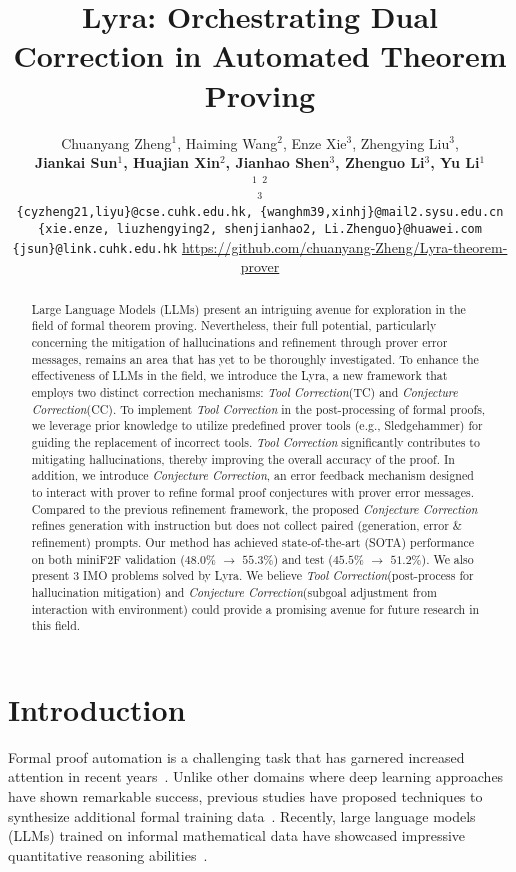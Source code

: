 \documentclass{article} \usepackage{iclr2024_conference,times}
\title{Lyra: Orchestrating Dual Correction in Automated Theorem Proving}
\author{Chuanyang Zheng$^{1}$,\space\space\space
  Haiming Wang$^{2}$,\space\space\space
  Enze Xie$^{3}$,\space\space\space
  Zhengying Liu$^{3}$,\space\space\space
\\ \vspace{0.15cm}
  \textbf{Jiankai Sun$^{1}$,\space\space\space
  Huajian Xin$^{2}$,\space\space\space
  Jianhao Shen$^{3}$,\space\space\space
  Zhenguo Li$^{3}$,\space\space\space
  Yu Li$^{1}$\space\space\space
  }
  \\
  $^{1}$\normalfont{The Chinese University of Hong Kong}\quad
  $^{2}$\normalfont{Sun Yat-sen University}\quad\\
  $^{3}$\normalfont{Huawei Noah’s Ark Lab}\quad
\vspace{0.15cm} \\
  {\tt\small \{cyzheng21,liyu\}@cse.cuhk.edu.hk,
  \{wanghm39,xinhj\}@mail2.sysu.edu.cn}\\
  {\tt\small\{xie.enze, liuzhengying2, shenjianhao2, Li.Zhenguo\}@huawei.com}\\
  {\tt\small\{jsun\}@link.cuhk.edu.hk}
  \AND
  \quad\quad\space\space\space\url{https://github.com/chuanyang-Zheng/Lyra-theorem-prover}
}
\def\methodOne{TC\xspace}
\def\methodOneFull{\textit{Tool Correction}\xspace}
\def\methodTwo{CC\xspace}
\def\methodTwoFull{\textit{Conjecture Correction}\xspace}
\def\fullname{Lyra\xspace}
\begin{document}
\maketitle

\begin{abstract}
Large Language Models (LLMs) present an intriguing avenue for exploration in the field of formal theorem proving. Nevertheless, their full potential, particularly concerning the mitigation of hallucinations and refinement through prover error messages, remains an area that has yet to be thoroughly investigated. To enhance the effectiveness of LLMs in the field, we introduce the \fullname, a new framework that employs two distinct correction mechanisms: \methodOneFull (\methodOne) and \methodTwoFull (\methodTwo).
To implement \methodOneFull in the post-processing of formal proofs, we leverage prior knowledge to utilize predefined prover tools (e.g., Sledgehammer) for guiding the replacement of incorrect tools. \methodOneFull significantly contributes to mitigating hallucinations, thereby improving the overall accuracy of the proof. 
In addition, we introduce \methodTwoFull, an error feedback mechanism designed to interact with prover to refine formal proof conjectures with prover error messages. Compared to the previous refinement framework, the proposed \methodTwoFull refines generation with instruction but does not collect paired (generation, error \& refinement) prompts.
Our method has
achieved state-of-the-art (SOTA) performance on both miniF2F validation ($48.0\%$ $\rightarrow$ $55.3\%$) and test ($45.5\%$ $\rightarrow$ $51.2\%$). 
We also present 3 IMO problems solved by \fullname.
We believe \methodOneFull (post-process for hallucination mitigation) and \methodTwoFull (subgoal adjustment from interaction with environment) could provide a promising avenue for future research in this field.
\end{abstract}

\section{Introduction}
Formal proof automation is a challenging task that has garnered increased attention in recent years~\citep{bansal2019holist,polu2020generative,lample2022hypertree,jiang2022thor,wu2022autoformalization, wang2023dt}. Unlike other domains where deep learning approaches have shown remarkable success, previous studies have proposed techniques to synthesize additional formal training data~\citep{wu2022autoformalization,polu2020generative,han2021proof, bansal2019learning,polu2023formal}. Recently, large language models (LLMs) trained on informal mathematical data have showcased impressive quantitative reasoning abilities~\citep{lewkowycz2022solving, welleck2022naturalprover}. 
\end{document}

